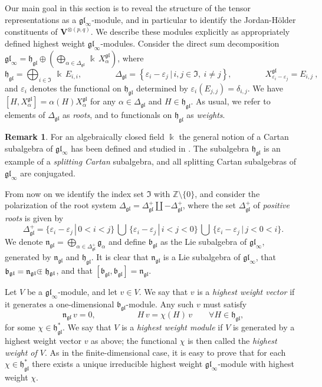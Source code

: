 \documentclass[12pt,reqno]{amsart}
\numberwithin{equation}{section}
\theoremstyle{plain}
\theoremstyle{definition}
\newtheorem{rem}{Remark}
\def\Z{\mathbb Z}
\def\eps{\varepsilon}
\def\gl{\mathfrak{gl}}
\def\a{\alpha}
\def\o{\otimes}
\def\g{\mathfrak g}
\def\b{\mathfrak b}
\def\h{\mathfrak h}
\def\n{\mathfrak n}
\def\VV{\mathbf V}
\def\cplus{\hbox{$\subset${\raise0.3ex\hbox{\kern -0.55em ${\scriptscriptstyle +}$}}\ }}
\def\({\left(}
\def\){\right)}
\begin{document}
\medskip

Our main goal in this section is to reveal the structure of the tensor
representations as a $\gl_\infty$-module, and in particular to
identify the Jordan-H\"older constituents of $\VV^{\o(p,q)}$. We describe these modules explicitly as appropriately defined highest weight $\gl_\infty$-modules. Consider the direct sum
decomposition $\gl_\infty = \h_\gl \oplus \( \bigoplus_{\a \in
\Delta_{\gl}} \, \Bbbk \, X_\a^{\gl} \)$, where
\begin{equation*}
    \h_\gl = \bigoplus_{i \in \mathfrak I} \ \Bbbk \, E_{i,i},
    \qquad\qquad
    \Delta_{\gl} = \left\{ \eps_i-\eps_j \, \biggr|\, i,j \in \mathfrak I,\ i \ne j
    \right\},
    \qquad\qquad
    X^{\gl}_{\eps_i-\eps_j} = E_{i,j}\ ,
\end{equation*}
and $\eps_i$ denotes the functional on $\h_\gl$ determined by
$\eps_i(E_{j,j}) = \delta_{i,j}$. We have $[H,X_\a^\gl] = \a(H)
X_\a^{\gl}$ for any  $\a\in \Delta_\gl$ and $H \in \h_\gl$. As
usual, we refer to elements of $\Delta_\gl$ as {\it roots}, and to
functionals on $\h_\gl$ as {\it weights}.

\begin{rem}
For an algebraically closed field $\Bbbk$ the general notion of a
Cartan subalgebra of $\gl_\infty$ has been defined and studied in
\cite{NP,DPS}.  The subalgebra $\h_\gl$ is an example of a {\it
splitting Cartan} subalgebra, and all splitting Cartan subalgebras
of $\gl_\infty$ are conjugated.
\end{rem}




From now on we identify the index set $\mathfrak I$ with
$\Z\setminus\{0\}$, and consider the polarization of the root system
$\Delta_\gl = \Delta_\gl^+ \coprod -\Delta_\gl^+$, where the set
$\Delta_\gl^+$ of {\it positive roots} is given by
\begin{equation*}
    \Delta_\gl^+ = \{ \eps_i-\eps_j \,|\, 0<i < j \} \,\bigcup \,
    \{ \eps_i-\eps_j \,|\, i < j < 0 \}
    \,\bigcup\, \{ \eps_i-\eps_j \,|\, j < 0 < i \}.
\end{equation*}
We denote $\n_\gl = \bigoplus_{\a\in\Delta_\gl^+} \g_\a$ and define $\b_\gl$ as the Lie subalgebra of $\gl_\infty$, generated by $\n_\gl$ and $\h_\gl$. It is clear that $\n_\gl$ is a Lie subalgebra of $\gl_\infty$,  that $\b_\gl = \n_\gl \cplus \h_\gl$, and that $[\b_\gl,\b_\gl] =
\n_\gl$.

Let $V$ be a $\gl_\infty$-module, and let $v\in V$. We say that $v$
is a {\it highest weight vector} if it generates a one-dimensional
$\b_\gl$-module. Any such $v$ must satisfy
\begin{equation*}
    \n_\gl \, v = 0,
    \qquad\qquad\quad
    H \, v = \chi(H)\, v
    \qquad
    \forall H \in \h_\gl,
\end{equation*}
for some $\chi \in \h_\gl^*$. We say that $V$ is a {\it highest weight
module} if $V$ is generated by a highest weight vector $v$ as above;
the functional $\chi$ is then called the {\it highest weight of $V$}. As
in the finite-dimensional case, it is easy to prove that for each
$\chi \in \h_\gl^*$ there exists a unique irreducible highest weight
$\gl_\infty$-module with highest weight $\chi$.
\end{document}
